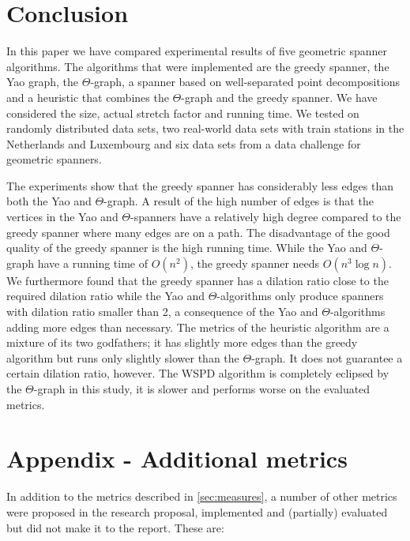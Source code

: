\documentclass[a4paper,twoside,11pt,hidelinks]{article}
\theoremstyle{plain}
\theoremstyle{definition}  %
\begin{document}
\section{Conclusion}
\label{sec:conclusion}
In this paper we have compared experimental results of five geometric spanner algorithms. The algorithms that were implemented are the greedy spanner, the Yao graph, the $\Theta$-graph, a spanner based on well-separated point decompositions and a heuristic that combines the $\Theta$-graph and the greedy spanner. We have considered the size, actual stretch factor and running time. We tested on randomly distributed data sets, two real-world data sets with train stations in the Netherlands and Luxembourg and six data sets from a data challenge for geometric spanners. 

The experiments show that the greedy spanner has considerably less edges than both the Yao and $\Theta$-graph. A result of the high number of edges is that the vertices in the Yao and $\Theta$-spanners have a relatively high degree compared to the greedy spanner where many edges are on a path.  The disadvantage of the good quality of the greedy spanner is the high running time. While the Yao and $\Theta$-graph have a running time of $O(n^2)$, the greedy spanner needs $O(n^3 \log n)$. We furthermore found that the greedy spanner has a dilation ratio close to the required dilation ratio while the Yao and $\Theta$-algorithms only produce spanners with dilation ratio smaller than 2, a consequence of the Yao and $\Theta$-algorithms adding more edges than necessary. The metrics of the heuristic algorithm are a mixture of its two godfathers; it has slightly more edges than the greedy algorithm but runs only slightly slower than the $\Theta$-graph. It does not guarantee a certain dilation ratio, however. The WSPD algorithm is completely eclipsed by the $\Theta$-graph in this study, it is slower and performs worse on the evaluated metrics.


%


\newpage
\appendix
\section{Appendix - Additional metrics}
\label{app:metrics}

In addition to the metrics described in \autoref{sec:measures}, a number of other metrics were proposed in the research proposal, implemented and (partially) evaluated but did not make it to the report. These are:
\end{document}
